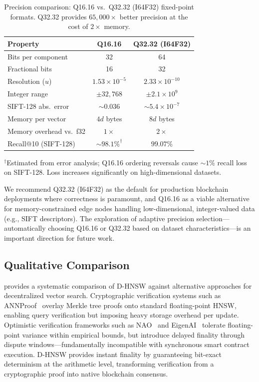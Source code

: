 \documentclass[10pt,journal]{IEEEtran}
\newcommand{\dhnsw}{\textsc{D-HNSW}}
\newcommand{\hnsw}{\textsc{HNSW}}
\begin{document}
\begin{table}[t]
  \centering
  \caption{Precision comparison: Q16.16 vs.\ Q32.32 (I64F32) fixed-point formats. Q32.32 provides $65{,}000\times$ better precision at the cost of $2\times$ memory.}
  \label{tab:precision_comparison}
  \footnotesize
  \begin{tabular}{lcc}
    \toprule
    \textbf{Property} & \textbf{Q16.16} & \textbf{Q32.32 (I64F32)} \\
    \midrule
    Bits per component    & 32         & 64 \\
    Fractional bits       & 16         & 32 \\
    Resolution ($u$)      & $1.53 \times 10^{-5}$ & $2.33 \times 10^{-10}$ \\
    Integer range         & $\pm 32{,}768$ & $\pm 2.1 \times 10^9$ \\
    SIFT-128 abs.\ error  & $\sim 0.036$ & $\sim 5.4 \times 10^{-7}$ \\
    Memory per vector     & $4d$ bytes & $8d$ bytes \\
    Memory overhead vs.\ f32 & $1\times$ & $2\times$ \\
    Recall@10 (SIFT-128)  & $\sim 98.1\%^\dagger$ & $99.07\%$ \\
    \bottomrule
  \end{tabular}
  \vspace{1mm}
  {\footnotesize $^\dagger$Estimated from error analysis; Q16.16 ordering reversals cause $\sim 1\%$ recall loss on SIFT-128. Loss increases significantly on high-dimensional datasets.}
\end{table}

We recommend Q32.32 (I64F32) as the default for production blockchain deployments where correctness is paramount, and Q16.16 as a viable alternative for memory-constrained edge nodes handling low-dimensional, integer-valued data (e.g., SIFT descriptors). The exploration of adaptive precision selection---automatically choosing Q16.16 or Q32.32 based on dataset characteristics---is an important direction for future work.

\subsection{Qualitative Comparison}

 provides a systematic comparison of \dhnsw{} against alternative approaches for decentralized vector search. Cryptographic verification systems such as ANNProof~\cite{lu2024annproof} overlay Merkle tree proofs onto standard floating-point \hnsw{}, enabling query verification but imposing heavy storage overhead per update. Optimistic verification frameworks such as NAO~\cite{yao2025nao} and EigenAI~\cite{alves2026eigenai} tolerate floating-point variance within empirical bounds, but introduce delayed finality through dispute windows---fundamentally incompatible with synchronous smart contract execution. \dhnsw{} provides instant finality by guaranteeing bit-exact determinism at the arithmetic level, transforming verification from a cryptographic proof into native blockchain consensus.
\end{document}
